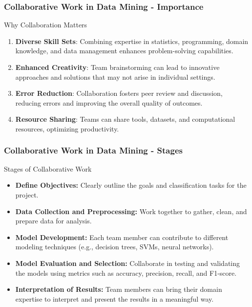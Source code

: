 \documentclass[aspectratio=169]{beamer}
\begin{document}
\begin{frame}[fragile]
    \frametitle{Collaborative Work in Data Mining - Importance}
    \begin{block}{Why Collaboration Matters}
        \begin{enumerate}
            \item \textbf{Diverse Skill Sets}: Combining expertise in statistics, programming, domain knowledge, and data management enhances problem-solving capabilities.
            \item \textbf{Enhanced Creativity}: Team brainstorming can lead to innovative approaches and solutions that may not arise in individual settings.
            \item \textbf{Error Reduction}: Collaboration fosters peer review and discussion, reducing errors and improving the overall quality of outcomes.
            \item \textbf{Resource Sharing}: Teams can share tools, datasets, and computational resources, optimizing productivity.
        \end{enumerate}
    \end{block}
\end{frame}

\begin{frame}[fragile]
    \frametitle{Collaborative Work in Data Mining - Stages}
    \begin{block}{Stages of Collaborative Work}
        \begin{itemize}
            \item \textbf{Define Objectives:} Clearly outline the goals and classification tasks for the project.
            \item \textbf{Data Collection and Preprocessing:} Work together to gather, clean, and prepare data for analysis.
            \item \textbf{Model Development:} Each team member can contribute to different modeling techniques (e.g., decision trees, SVMs, neural networks).
            \item \textbf{Model Evaluation and Selection:} Collaborate in testing and validating the models using metrics such as accuracy, precision, recall, and F1-score.
            \item \textbf{Interpretation of Results:} Team members can bring their domain expertise to interpret and present the results in a meaningful way.
        \end{itemize}
    \end{block}
\end{frame}
\end{document}
